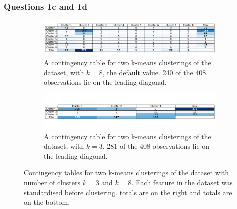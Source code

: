 \subsubsection{Questions 1c and 1d}\label{subsubsec:q1cd}
    \begin{figure}[htb]
    \centering
    \begin{subfigure}[b]{0.9\linewidth}
        \includegraphics[width=1\textwidth]{./figures/q1c}
        \caption{A contingency table for two k-means clusterings of the  dataset, with $k=8$,
            the default  value. 240 of the 408 observations lie on the leading diagonal.}
        \label{fig:q1c}
    \end{subfigure}
    \hfill
    \begin{subfigure}[b]{0.9\linewidth}
        \includegraphics[width=1\textwidth]{./figures/q1d}
        \caption{A contingency table for two k-means clusterings of the  dataset, with $k=3$.
            281 of the 408 observations lie on the leading diagonal.}
        \label{fig:q1d}
    \end{subfigure}
    \caption{Contingency tables for two k-means clusterings of the  dataset with number of
        clusters $k=3$ and $k=8$.
        Each feature in the dataset was standardised before clustering.
         totals are on the right and  totals are on the bottom.}
    \label{fig:q1cd}
    \end{figure}

